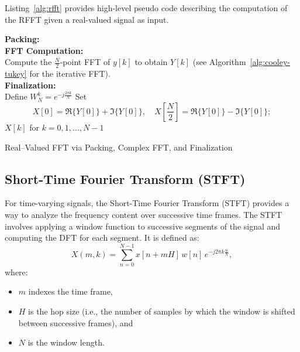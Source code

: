 \documentclass[12pt,letter]{article}
\begin{document}
Listing~\ref{alg:rfft} provides high-level pseudo code describing the
computation of the RFFT given a real-valued signal as input.

\begin{algorithm}[H]
\SetAlgoLined
{}
\textbf{Packing:}\\
\textbf{FFT Computation:}\\
Compute the \( \frac{N}{2} \)-point FFT of \( y[k] \) to obtain \( Y[k] \) \;
(see Algorithm~\ref{alg:cooley-tukey} for the iterative FFT).\\
\textbf{Finalization:}\\
Define \( W_N^k = e^{-j\frac{2\pi k}{N}} \) \;
Set
\[
X[0] = \Re\{Y[0]\} + \Im\{Y[0]\}, \quad X\left[\frac{N}{2}\right] = \Re\{Y[0]\} - \Im\{Y[0]\};
\]
\Return \( X[k] \) for \( k = 0,1,\dots,N-1 \)\;
\caption{Real--Valued FFT via Packing, Complex FFT, and Finalization}
\label{alg:rfft}
\end{algorithm}

\subsection{Short-Time Fourier Transform (STFT)}

For time-varying signals, the Short-Time Fourier Transform (STFT) provides a
way to analyze the frequency content over successive time frames. The STFT
involves applying a window function to successive segments of the signal and
computing the DFT for each segment. It is defined as:
\begin{equation}
X(m, k) = \sum_{n=0}^{N-1} x[n + mH] \, w[n] \, e^{-j2\pi k \frac{n}{N}},
\label{eqn:stft}
\end{equation}
where:
\begin{itemize}
  \item $m$ indexes the time frame,
  \item $H$ is the hop size (i.e., the number of samples by which the window
  is shifted between successive frames), and
  \item $N$ is the window length.
\end{itemize}
\end{document}
